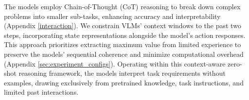 The models employ Chain-of-Thought (CoT) reasoning \cite{wei2022chain} to break down complex problems into smaller sub-tasks, enhancing accuracy and interpretability (Appendix \ref{interaction}). We constrain VLMs’ context windows to the past two steps, incorporating state representations alongside the model’s action responses. This approach prioritizes extracting maximum value from limited experience to preserve the models’ sequential coherence and minimize computational overhead (Appendix \ref{sec:experiment_configs}). Operating within this context-aware zero-shot reasoning framework, the models interpret task requirements without examples,  drawing exclusively from pretrained knowledge, task instructions, and limited past interactions. 